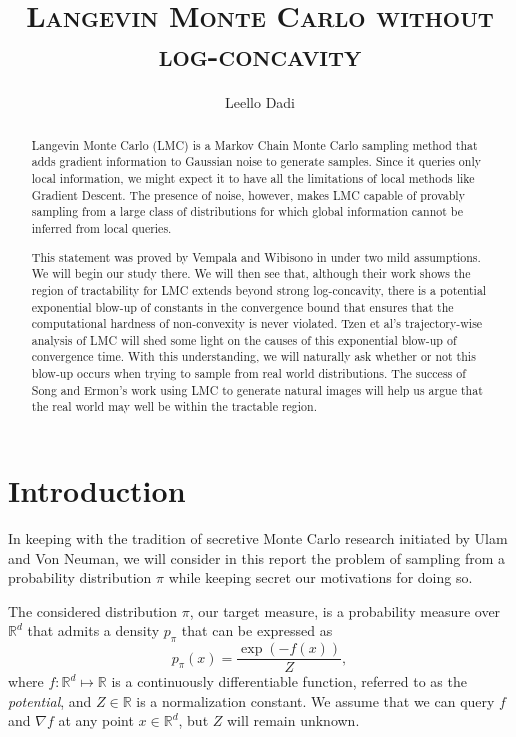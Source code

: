 \documentclass[11pt,twoside]{article}
\title{\textsc{Langevin Monte Carlo without log-concavity}}
\author{Leello Dadi}
\date{}
\theoremstyle{definition}
\newcommand{\R}{\mathbb{R}}
\begin{document}
\maketitle

\begin{abstract}
    Langevin Monte Carlo (LMC) is a Markov Chain Monte Carlo sampling method that adds gradient information to Gaussian noise to generate samples. Since it queries only local information, we might expect it to have all the limitations of local methods like Gradient Descent. The presence of noise, however, makes LMC capable of provably sampling from a large class of distributions for which global information cannot be inferred from local queries. 
    
    This statement was proved by Vempala and Wibisono in \cite{vempala_rapid_2019} under two mild assumptions. We will begin our study there. We will then see that, although their work shows the region of tractability for LMC extends beyond strong log-concavity, there is a potential exponential blow-up of constants in the convergence bound that ensures that the computational hardness of non-convexity is never violated. Tzen et al's trajectory-wise analysis of LMC \cite{tzen_local_2018} will shed some light on the causes of this exponential blow-up of convergence time. With this understanding, we will naturally ask whether or not this blow-up occurs when trying to sample from real world distributions. The success of Song and Ermon's work \cite{song_generative_2019} using LMC to generate natural images will help us argue that the real world may well be within the tractable region.
\end{abstract}

\section{Introduction}

In keeping with the tradition of secretive Monte Carlo research initiated by Ulam and Von Neuman, we will consider in this report the problem of sampling from a probability distribution $\pi$ while keeping secret our motivations for doing so. 

The considered distribution $\pi$, our target measure, is a probability measure over $\R^d$ that admits a density $p_\pi$ that can be expressed as
\[
p_\pi(x) = \frac{\exp{\left(-f(x)\right)}}{Z},
\]
where $f: \R^d \mapsto \R$ is a continuously differentiable function, referred to as the \textit{potential}, and $Z \in \R$ is a normalization constant. We assume that we can query $f$ and $\nabla f$ at any point $x \in \R^d$, but $Z$ will remain unknown.
\end{document}
